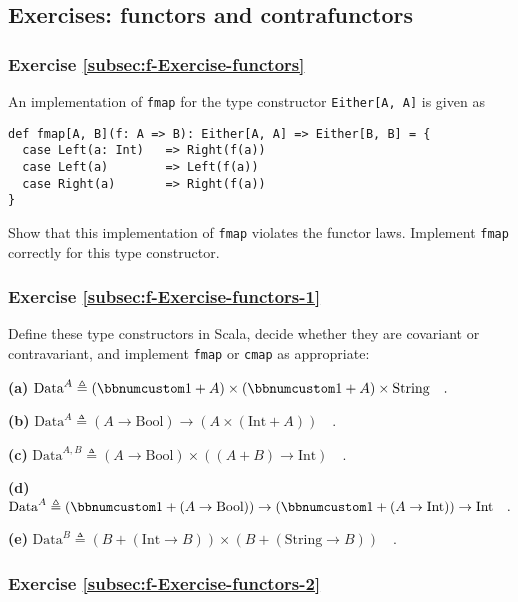 \subsection{Exercises: functors and contrafunctors}

\subsubsection{Exercise \label{subsec:f-Exercise-functors}\ref{subsec:f-Exercise-functors}}

An implementation of \lstinline!fmap! for the type constructor \lstinline!Either[A, A]!
is given as
\begin{lstlisting}
def fmap[A, B](f: A => B): Either[A, A] => Either[B, B] = {
  case Left(a: Int)   => Right(f(a))
  case Left(a)        => Left(f(a))
  case Right(a)       => Right(f(a))
}
\end{lstlisting}
Show that this implementation of \lstinline!fmap! violates the functor
laws. Implement \lstinline!fmap! correctly for this type constructor.

\subsubsection{Exercise \label{subsec:f-Exercise-functors-1}\ref{subsec:f-Exercise-functors-1}}

Define these type constructors in Scala, decide whether they are covariant
or contravariant, and implement \lstinline!fmap! or \lstinline!cmap!
as appropriate:

\textbf{(a)} $\text{Data}^{A}\triangleq\left(\bbnum 1+A\right)\times\left(\bbnum 1+A\right)\times\text{String}\quad.$

\textbf{(b)} $\text{Data}^{A}\triangleq(A\rightarrow\text{Bool})\rightarrow\left(A\times\left(\text{Int}+A\right)\right)\quad.$

\textbf{(c)} $\text{Data}^{A,B}\triangleq(A\rightarrow\text{Bool})\times\left((A+B)\rightarrow\text{Int}\right)\quad.$

\textbf{(d)} $\text{Data}^{A}\triangleq(\bbnum 1+(A\rightarrow\text{Bool}))\rightarrow(\bbnum 1+(A\rightarrow\text{Int}))\rightarrow\text{Int}\quad.$

\textbf{(e)} $\text{Data}^{B}\triangleq(B+(\text{Int}\rightarrow B))\times(B+(\text{String}\rightarrow B))\quad.$

\subsubsection{Exercise \label{subsec:f-Exercise-functors-2}\ref{subsec:f-Exercise-functors-2}}

